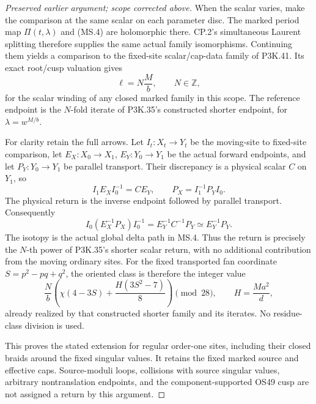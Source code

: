 \begin{proof}[Preserved earlier argument; scope corrected above]
When the scalar varies, make the comparison at the same scalar on
each parameter disc. The marked period map \(\Pi(t,\lambda)\)
and (MS.4) are holomorphic there. CP.2's simultaneous Laurent splitting
therefore supplies the same actual family isomorphisms. Continuing
them yields a comparison to the fixed-site scalar/cap-data family of
P3K.41. Its exact root/cusp valuation gives
\[
                     \ell=N\frac{M}{b},\qquad N\in\mathbb Z,
                                                               \tag{MS.9}
\]
for the scalar winding of any closed marked family in this scope.
The reference endpoint is the \(N\)-fold iterate of P3K.35's
constructed shorter endpoint, for \(\lambda=w^{M/b}\).

For clarity retain the full arrows. Let \(I_t:X_t\to Y_t\)
be the moving-site to fixed-site comparison, let
\(E_X:X_0\to X_1\), \(E_Y:Y_0\to Y_1\) be the actual
forward endpoints, and let \(P_Y:Y_0\to Y_1\) be parallel
transport. Their discrepancy is a physical scalar \(C\) on
\(Y_1\), so
\[
 I_1E_XI_0^{-1}=C E_Y,\qquad
 P_X=I_1^{-1}P_YI_0.
\]
The physical return is the inverse endpoint followed by parallel
transport. Consequently
\[
 I_0(E_X^{-1}P_X)I_0^{-1}
       =E_Y^{-1}C^{-1}P_Y
       \simeq E_Y^{-1}P_Y.                                \tag{MS.10}
\]
The isotopy is the actual global delta path in MS.4. Thus the return
is precisely the \(N\)-th power of P3K.35's shorter scalar return,
with no additional contribution from the moving ordinary sites.
For the fixed transported fan coordinate \(S=p^2-pq+q^2\), the
oriented class is therefore the integer value
\[
 \frac{N}{b}\left(\chi(4-3S)+\frac{H(3S^2-7)}8\right)
            \pmod {28},\qquad H=\frac{Ma^2}{d},           \tag{MS.11}
\]
already realized by that constructed shorter family and its iterates.
No residue-class division is used.

This proves the stated extension for regular order-one sites, including
their closed braids around the fixed singular values. It retains the
fixed marked source and effective caps. Source-moduli loops,
collisions with source singular values, arbitrary nontranslation
endpoints, and the component-supported OS49 cusp are not assigned a
return by this argument.

\end{proof}
